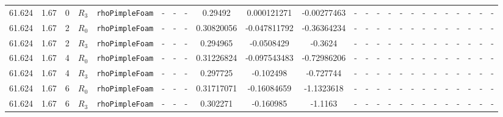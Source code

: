 \documentclass[12pt]{article}
\begin{document}
\begin{table}[H]
{\begin{tabular}{ccccc|ccc|ccc|ccc|ccc|ccccccc}
        \rowcolor{blue!40}
        61.624 & 1.67 & 0 & $R_3$ & \texttt{rhoPimpleFoam} & - & - & - & 0.29492 & 0.000121271 & -0.00277463  & - & - & - & - & - & - & - & - & - & - & - & - & - \\ 
        \rowcolor{blue!10}
        61.624 & 1.67 & 2 & $R_0$ & \texttt{rhoPimpleFoam} & - & - & - & 0.30820056 & -0.047811792 & -0.36364234 & - & - & - & - & - & - & - & - & - & - & - & - & - \\
        \rowcolor{blue!40}
        61.624 & 1.67 & 2 & $R_3$ & \texttt{rhoPimpleFoam} & - & - & - & 0.294965 & -0.0508429 & -0.3624  & - & - & - & - & - & - & - & - & - & - & - & - & - \\
        \rowcolor{blue!10}
        61.624 & 1.67 & 4 & $R_0$ & \texttt{rhoPimpleFoam} & - & - & - & 0.31226824 & -0.097543483 & -0.72986206 & - & - & - & - & - & - & - & - & - & - & - & - & - \\
        \rowcolor{blue!40}
        61.624 & 1.67 & 4 & $R_3$ & \texttt{rhoPimpleFoam} & - & - & - & 0.297725 & -0.102498 & -0.727744 & - & - & - & - & - & - & - & - & - & - & - & - & - \\
        \rowcolor{blue!10}
        61.624 & 1.67 & 6 & $R_0$ & \texttt{rhoPimpleFoam} & - & - & - & 0.31717071 & -0.16084659 & -1.1323618 & - & - & - & - & - & - & - & - & - & - & - & - & - \\
        \rowcolor{blue!40}
        61.624 & 1.67 & 6 & $R_3$ & \texttt{rhoPimpleFoam} & - & - & - & 0.302271 & -0.160985 & -1.1163 & - & - & - & - & - & - & - & - & - & - & - & - & - \\        

\end{tabular}}
\end{table}
\end{document}

